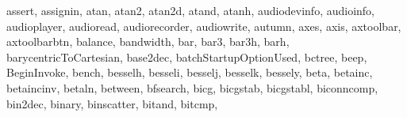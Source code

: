 {{        assert,%
        assignin,%
        atan,%
        atan2,%
        atan2d,%
        atand,%
        atanh,%
        audiodevinfo,%
        audioinfo,%
        audioplayer,%
        audioread,%
        audiorecorder,%
        audiowrite,%
        autumn,%
        axes,%
        axis,%
        axtoolbar,%
        axtoolbarbtn,%
        balance,%
        bandwidth,%
        bar,%
        bar3,%
        bar3h,%
        barh,%
        barycentricToCartesian,%
        base2dec,%
        batchStartupOptionUsed,%
        bctree,%
        beep,%
        BeginInvoke,%
        bench,%
        besselh,%
        besseli,%
        besselj,%
        besselk,%
        bessely,%
        beta,%
        betainc,%
        betaincinv,%
        betaln,%
        between,%
        bfsearch,%
        bicg,%
        bicgstab,%
        bicgstabl,%
        biconncomp,%
        bin2dec,%
        binary,%
        binscatter,%
        bitand,%
        bitcmp,%
}}

